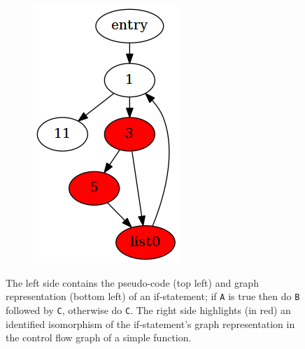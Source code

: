 \begin{figure}[htbp]
\begin{subfigure}[ht]{0.18\textwidth}
		\includegraphics[width=\textwidth]{poster/inc/foo.png}
	\end{subfigure}
	\caption{The left side contains the pseudo-code (top left) and graph representation (bottom left) of an if-statement; if \texttt{A} is true then do \texttt{B} followed by \texttt{C}, otherwise do \texttt{C}. The right side highlights (in red) an identified isomorphism of the if-statement's graph representation in the control flow graph of a simple function.}
	\label{fig:representation_and_identification_of_primitive}
\end{figure}
